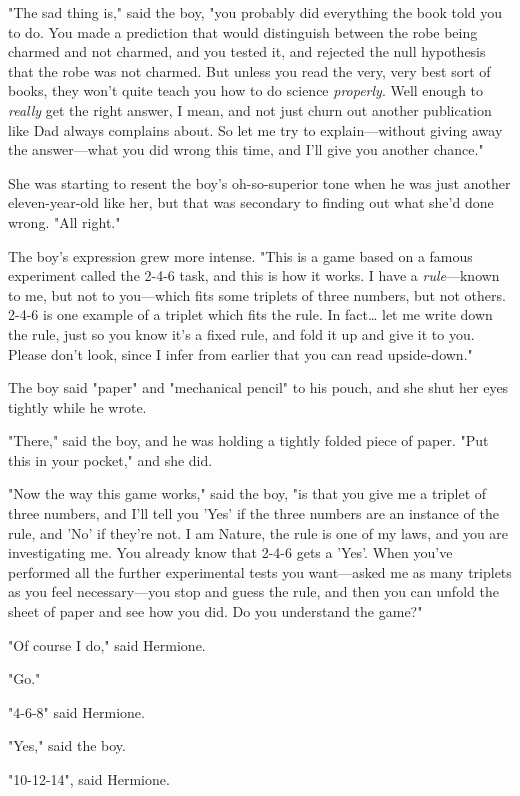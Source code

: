 "The sad thing is," said the boy, "you probably did everything the book told you to do. You made a prediction that would distinguish between the robe being charmed and not charmed, and you tested it, and rejected the null hypothesis that the robe was not charmed. But unless you read the very, very best sort of books, they won't quite teach you how to do science \emph{properly}. Well enough to \emph{really} get the right answer, I mean, and not just churn out another publication like Dad always complains about. So let me try to explain---without giving away the answer---what you did wrong this time, and I'll give you another chance."

She was starting to resent the boy's oh-so-superior tone when he was just another eleven-year-old like her, but that was secondary to finding out what she'd done wrong. "All right."

The boy's expression grew more intense. "This is a game based on a famous experiment called the 2-4-6 task, and this is how it works. I have a \emph{rule}---known to me, but not to you---which fits some triplets of three numbers, but not others. 2-4-6 is one example of a triplet which fits the rule. In fact{\ldots} let me write down the rule, just so you know it's a fixed rule, and fold it up and give it to you. Please don't look, since I infer from earlier that you can read upside-down."

The boy said "paper" and "mechanical pencil" to his pouch, and she shut her eyes tightly while he wrote.

"There," said the boy, and he was holding a tightly folded piece of paper. "Put this in your pocket," and she did.

"Now the way this game works," said the boy, "is that you give me a triplet of three numbers, and I'll tell you 'Yes' if the three numbers are an instance of the rule, and 'No' if they're not. I am Nature, the rule is one of my laws, and you are investigating me. You already know that 2-4-6 gets a 'Yes'. When you've performed all the further experimental tests you want---asked me as many triplets as you feel necessary---you stop and guess the rule, and then you can unfold the sheet of paper and see how you did. Do you understand the game?"

"Of course I do," said Hermione.

"Go."

"4-6-8" said Hermione.

"Yes," said the boy.

"10-12-14", said Hermione.

